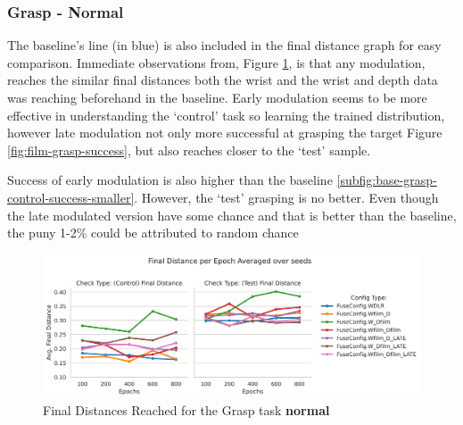 \subsubsection{Grasp - Normal}
The baseline's line (in blue) is also included in the final distance graph for easy comparison. Immediate observations from, Figure \ref{fig:film-grasp-final}, is that any modulation, reaches the similar final distances both the wrist and the wrist and depth data was reaching beforehand in the baseline. Early modulation seems to be more effective in understanding the `control' task so learning the trained distribution, however late modulation not only more successful at grasping the target Figure \ref{fig:film-grasp-success}, but also reaches closer to the `test' sample. 

Success of early modulation is also higher than the baseline \ref{subfig:base-grasp-control-success-smaller}. However, the `test' grasping is no better. Even though the late modulated version have some chance and that is better than the baseline, the puny 1-2\% could be attributed to random chance 

\begin{figure}[H]
  \centering
  \includegraphics[width=\linewidth]{assets/evaluation/film/film-grasp-final.png}
  \caption{Final Distances Reached for the Grasp task \textbf{normal}}\label{fig:film-grasp-final}
\end{figure}

